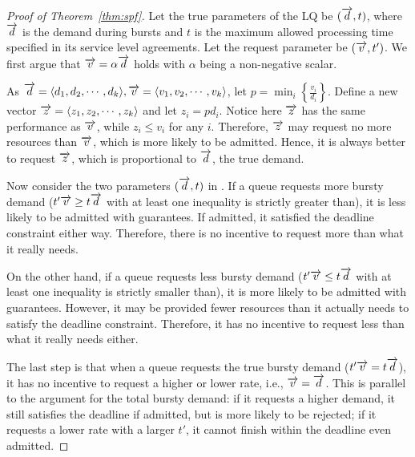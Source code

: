\begin{proof}[Proof of Theorem~\ref{thm:spf}]

Let the true parameters of the LQ be $(\protect\overrightarrow{d},t)$, where $\protect\overrightarrow{d}$ is the demand during bursts and $t$ is the maximum allowed processing time specified in its service level agreements. Let the request parameter be $(\protect\overrightarrow{v},t')$. We first argue that $\protect\overrightarrow{v}=\alpha \protect\overrightarrow{d}$ holds with $\alpha$ being a non-negative scalar.

As $\protect\overrightarrow{d}=\langle d_1,d_2,\cdots,d_k \rangle,\protect\overrightarrow{v}=\langle v_1,v_2,\cdots,v_k \rangle$, let $p= \min_i \left\{\frac{v_i}{d_i}\right\}$. Define a new vector $\protect\overrightarrow{z}= \langle z_1,z_2,\cdots,z_k \rangle$ and let $z_i  = pd_i$. Notice here $\protect\overrightarrow{z}$ has the same performance as $\protect\overrightarrow{v}$, while $z_i \leq v_i$ for any $i$. Therefore, $\protect\overrightarrow{z}$ may request no more resources than $\protect\overrightarrow{v}$, which is more likely to be admitted. Hence, it is always better to request $\protect\overrightarrow{z}$, which is proportional to $\protect\overrightarrow{d}$, the true demand.


Now consider the two parameters $(\protect\overrightarrow{d},t)$ in \name. If a queue requests more bursty demand ($t'\protect\overrightarrow{v} \geq t\protect\overrightarrow{d}$ with at least one inequality is strictly greater than), it is less likely to be admitted with guarantees. If admitted, it satisfied the deadline constraint either way. Therefore, there is no incentive to request more than what it really needs.

On the other hand, if a queue requests less bursty demand ($t'\protect\overrightarrow{v} \leq t\protect\overrightarrow{d}$ with at least one inequality is strictly smaller than), it is more likely to be admitted with guarantees. However, it may be provided fewer resources than it actually needs to satisfy the deadline constraint. Therefore, it has no incentive to request less than what it really needs either.

The last step is that when a queue requests the true bursty demand ($t'\protect\overrightarrow{v} = t\protect\overrightarrow{d}$), it has no incentive to request a higher or lower rate, i.e., $\protect\overrightarrow{v}=\protect\overrightarrow{d}$. This is parallel to the argument for the total bursty demand: if it requests a higher demand, it still satisfies the deadline if admitted, but is more likely to be rejected; if it requests a lower rate with a larger $t'$, it cannot finish within the deadline even admitted. 


\end{proof}
